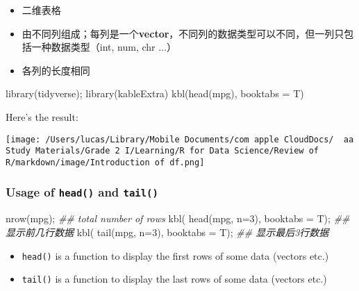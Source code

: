 \documentclass[
]{article}
\let\oldincludegraphics\includegraphics
\renewcommand{\includegraphics}[2][]{\begin{center}\oldincludegraphics[#1]{#2}\end{center}}
\newenvironment{Shaded}{}{}
\newcommand{\AttributeTok}[1]{\textcolor[rgb]{0.49,0.56,0.16}{#1}}
\newcommand{\DecValTok}[1]{\textcolor[rgb]{0.25,0.63,0.44}{#1}}
\newcommand{\DocumentationTok}[1]{\textcolor[rgb]{0.73,0.13,0.13}{\textit{#1}}}
\newcommand{\FunctionTok}[1]{\textcolor[rgb]{0.02,0.16,0.49}{#1}}
\newcommand{\NormalTok}[1]{#1}
\begin{document}
\begin{itemize}
\item
  二维表格
\item
  由不同列组成；每列是一个\textbf{vector}，不同列的数据类型可以不同，但一列只包括一种数据类型（int,
  num, chr ...）
\item
  各列的长度相同
\end{itemize}

\begin{Shaded}
\begin{Highlighting}[]
\FunctionTok{library}\NormalTok{(tidyverse);}
\FunctionTok{library}\NormalTok{(kableExtra)}
\FunctionTok{kbl}\NormalTok{(}\FunctionTok{head}\NormalTok{(mpg), }
    \AttributeTok{booktabs =}\NormalTok{ T)}
\end{Highlighting}
\end{Shaded}

Here's the result:

\texttt{[image: /Users/lucas/Library/Mobile Documents/com~apple~CloudDocs/~~aa Study Materials/Grade 2 I/Learning/R for Data Science/Review of R/markdown/image/Introduction of df.png]}

\hypertarget{usage-of-head-and-tail}{%
\subsubsection{\texorpdfstring{\textbf{Usage of \texttt{head()} and
\texttt{tail()}}}{Usage of head() and tail()}}\label{usage-of-head-and-tail}}

\begin{Shaded}
\begin{Highlighting}[]
\FunctionTok{nrow}\NormalTok{(mpg); }\DocumentationTok{\#\# total number of rows }
\FunctionTok{kbl}\NormalTok{( }\FunctionTok{head}\NormalTok{(mpg,  }\AttributeTok{n=}\DecValTok{3}\NormalTok{), }\AttributeTok{booktabs =}\NormalTok{ T); }\DocumentationTok{\#\# 显示前几行数据}
\FunctionTok{kbl}\NormalTok{( }\FunctionTok{tail}\NormalTok{(mpg,  }\AttributeTok{n=}\DecValTok{3}\NormalTok{), }\AttributeTok{booktabs =}\NormalTok{ T); }\DocumentationTok{\#\# 显示最后3行数据}
\end{Highlighting}
\end{Shaded}

\begin{itemize}
\item
  \texttt{head()} is a function to display the first rows of some data
  (vectors etc.)
\item
  \texttt{tail()} is a function to display the last rows of some data
  (vectors etc.)
\end{itemize}
\end{document}
